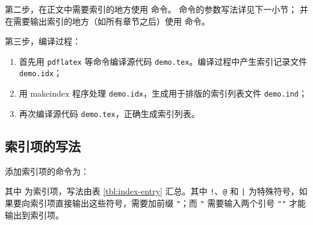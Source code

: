 第二步，在正文中需要索引的地方使用  命令。 命令的参数写法详见下一小节；
并在需要输出索引的地方（如所有章节之后）使用  命令。

第三步，编译过程：

\begin{enumerate}
  \item 首先用 \texttt{pdflatex} 等命令编译源代码 \texttt{demo.tex}。编译过程中产生索引记录文件 \texttt{demo.idx}；
  \item 用 makeindex 程序处理 \texttt{demo.idx}，生成用于排版的索引列表文件 \texttt{demo.ind}；
  \item 再次编译源代码 \texttt{demo.tex}，正确生成索引列表。
\end{enumerate}

\subsection{索引项的写法}\label{subsec:index-entry}

添加索引项的命令为：
\begin{command}
\end{command}

其中  为索引项，写法由表 \ref{tbl:index-entry} 汇总。其中 \texttt!、\texttt @ 和 \texttt| 
为特殊符号，如果要向索引项直接输出这些符号，需要加前缀 \texttt"；而 \texttt" 需要输入两个引号 \texttt{""} 才能输出到索引项。

